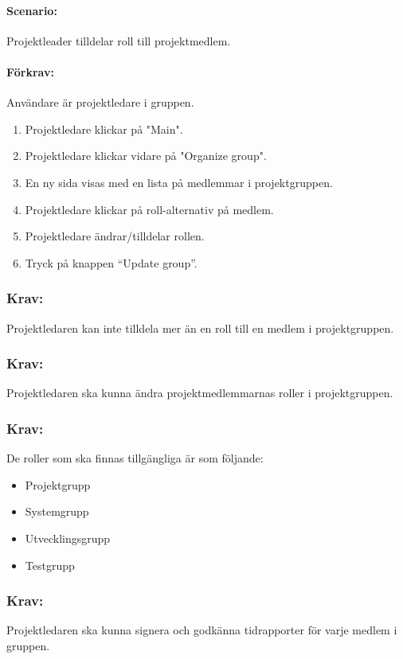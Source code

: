 \documentclass[paper=a4, fontsize=11pt,twoside]{article}
\begin{document}
	\paragraph{Scenario:}
	Projektleader tilldelar roll till projektmedlem.
	\paragraph{Förkrav:}
	Användare är projektledare i gruppen.
	\begin{enumerate} 
		\item Projektledare klickar på "Main".
		\item Projektledare klickar vidare på "Organize group".
		\item En ny sida visas med en lista på medlemmar i projektgruppen.
		\item Projektledare klickar på roll-alternativ på medlem.
		\item Projektledare ändrar/tilldelar rollen.
		\item Tryck på knappen “Update group”.
	\end{enumerate}
	
	\paragraph{}
	\subsubsection{Krav:}
	Projektledaren kan inte tilldela mer än en roll till en medlem i projektgruppen.
	
	\subsubsection{Krav:}
	Projektledaren ska kunna ändra projektmedlemmarnas roller i projektgruppen.
	\subsubsection{Krav:}
	De roller som ska finnas tillgängliga är som följande:
	\begin{itemize}
		\item Projektgrupp
		\item Systemgrupp
		\item Utvecklingsgrupp
		\item Testgrupp
	\end{itemize}
	
	\subsubsection{Krav:}
	Projektledaren ska kunna signera och godkänna tidrapporter för varje medlem i gruppen.
	
\end{document}
